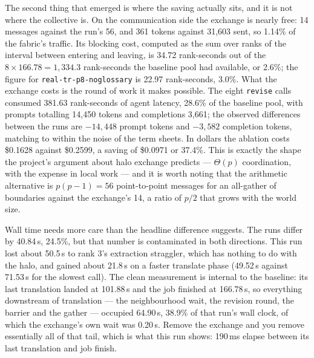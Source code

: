 \documentclass[11pt]{article}
\begin{document}
The second thing that emerged is where the saving actually sits, and it is not where the collective
is. On the communication side the exchange is nearly free: 14 messages against the run's 56, and
361 tokens against 31,603 sent, so 1.14\% of the fabric's traffic. Its blocking cost, computed as the
sum over ranks of the interval between entering and leaving, is 34.72 rank-seconds out of the
$8\times166.78=1{,}334.3$ rank-seconds the baseline pool had available, or 2.6\%; the figure for
\texttt{real-tr-p8-noglossary} is 22.97 rank-seconds, 3.0\%. What the exchange costs is the round of
work it makes possible. The eight \texttt{revise} calls consumed 381.63 rank-seconds of agent latency,
28.6\% of the baseline pool, with prompts totalling 14,450 tokens and completions 3,661; the observed
differences between the runs are $-14{,}448$ prompt tokens and $-3{,}582$ completion tokens, matching
to within the noise of the term sheets. In dollars the ablation costs \$0.1628 against \$0.2599, a
saving of \$0.0971 or 37.4\%. This is exactly the shape the project's argument about halo exchange
predicts --- $\Theta(p)$ coordination, with the expense in local work --- and it is worth noting that
the arithmetic alternative is $p(p-1)=56$ point-to-point messages for an all-gather of boundaries
against the exchange's 14, a ratio of $p/2$ that grows with the world size.

Wall time needs more care than the headline difference suggests. The runs differ by 40.84\,s, 24.5\%,
but that number is contaminated in both directions. This run lost about 50.5\,s to rank 3's
extraction straggler, which has nothing to do with the halo, and gained about 21.8\,s on a faster
translate phase (49.52\,s against 71.53\,s for the slowest call). The clean measurement is internal to
the baseline: its last translation landed at 101.88\,s and the job finished at 166.78\,s, so
everything downstream of translation --- the neighbourhood wait, the revision round, the barrier and
the gather --- occupied 64.90\,s, 38.9\% of that run's wall clock, of which the exchange's own wait was
0.20\,s. Remove the exchange and you remove essentially all of that tail, which is what this run
shows: 190\,ms elapse between its last translation and job finish.
\end{document}
